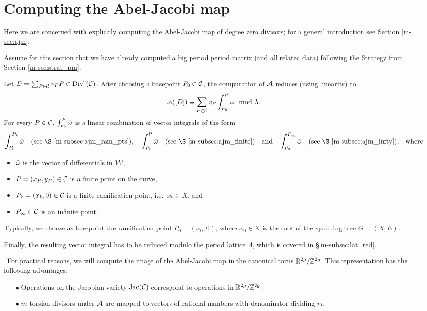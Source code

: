\documentclass[main.tex]{subfiles}
\begin{document}
  \section{Computing the Abel-Jacobi map}\label{sec:comp_ajm}

   Here we are concerned with explicitly computing the Abel-Jacobi map of degree zero divisors; for a general introduction see Section \ref{m-sec:ajm}.

   Assume for this section that we have already computed a big period period matrix (and all related data) following the Strategy from Section \ref{m-sec:strat_pm}.

   Let $D = \sum_{P \in \mathcal{C}} v_P P \in \operatorname{Div}^0(\mathcal{C})$. After choosing a basepoint $P_0 \in \mathcal{C}$, the computation of $\mathcal{A}$ reduces (using linearity) to
   \begin{equation*}
     \mathcal{A}([D]) \equiv \sum_{P \in \mathcal{C}} v_P \int_{P_0}^P \bar{\omega} \mod \Lambda.
   \end{equation*}
  For every $P \in \mathcal{C}$, $\int_{P_0}^P \bar{\omega}$ is a linear combination of vector integrals of the form
  \begin{align*}
    \int_{P_0}^{P_k} \bar\w\quad \text{(see \S \ref{m-subsec:ajm_ram_pts}),} \quad
    \int_{P_k}^{P} \bar\w \quad \text{(see \S \ref{m-subsec:ajm_finite})}
    \quad \text{and} \quad \int_{P_0}^{P_{\infty}} \bar\w\quad \text{(see \S \ref{m-subsec:ajm_infty}),} \quad \text{where}
  \end{align*}
  \begin{itemize}
   \item $\bar{\omega}$ is the vector of differentials in $\mathcal{W}$,
   \item $P = (x_P,y_P) \in \mathcal{C}$ is a finite point on the curve,
   \item $P_k = (x_k,0) \in \mathcal{C}$ is a finite ramification point, i.e.\ $x_k \in X$, and
   \item $P_{\infty} \in \mathcal{C}$ is an infinite point.
  \end{itemize}

   Typically, we choose as basepoint the ramification point $P_0 = (x_0,0)$, where $x_0 \in X$ is the root of the spanning tree $G = (X,E)$.

  Finally, the resulting vector integral has to be reduced modulo the period lattice $\Lambda$, which is covered in \S \ref{m-subsec:lat_red}.

   \begin{rmk} \
  For practical reasons, we will compute the
  image of the Abel-Jacobi map in the canonical torus $\mathbb{R}^{2g} / \mathbb{Z}^{2g}$.
This representation has the following advantages:
    \begin{itemize}
     \item[$\bullet$] Operations on the Jacobian variety $\operatorname{Jac}(\mathcal{C})$ correspond to operations in $\mathbb{R}^{2g}/\mathbb{Z}^{2g}$.
     \item[$\bullet$] $m$-torsion divisors under $\mathcal{A}$ are mapped to vectors of rational numbers with
     denominator dividing $m$.
         \end{itemize}
   \end{rmk}
\end{document}
